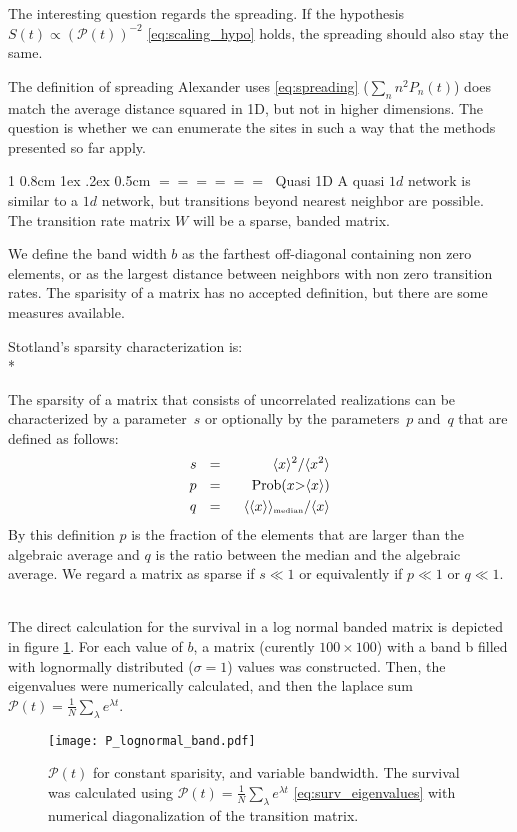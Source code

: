 \documentclass[onecolumn,fleqn,notitlepage,secnumarabic]{revtex4}
\makeatletter
\newcommand{\tbox}[1]{\mbox{\tiny #1}}
\newenvironment{fminipage}%
  {\begin{Sbox}\begin{minipage}}%
  {\end{minipage}\end{Sbox}\fbox{\TheSbox}}
\def\section{%
  \@startsection
    {section}%
    {1}%
    {\z@}%
    {0.8cm \@plus1ex \@minus .2ex}%
    {0.5cm}%
    {\Large\bf $=\!=\!=\!=\!=\!=\;$}%
}%
\makeatother
\begin{document}
The interesting question regards the spreading. If the hypothesis $S(t) \propto \left(\mathcal{P}(t)\right)^{-2}$ \eqref{eq:scaling_hypo} holds, the spreading should also stay the same. 

The definition of spreading Alexander uses \eqref{eq:spreading} ($\sum_n n^2 P_n(t)$) does match the average distance squared in 1D, but not in higher dimensions. The question is whether we can enumerate the sites in such a way that the methods presented so far apply.

\section{Quasi 1D}\label{sec:quasi1d}
A quasi $1d$ network is similar to a $1d$ network, but transitions beyond nearest neighbor are possible. The transition rate matrix $W$ will be a sparse, banded matrix. 

We define the band width $b$ as the farthest off-diagonal containing non zero elements, or as the largest distance between neighbors with non zero transition rates. The sparisity of a matrix has no accepted definition, but there are some measures available.


Stotland's \cite{Stotland:2010:PRB}  sparsity characterization is:\\*
\begin{fminipage}{\textwidth}
The sparsity of a matrix that consists of 
uncorrelated realizations can be characterized 
by a parameter~$s$ or optionally 
by the parameters~$p$ and~$q$ that 
are defined as follows: 
%
\begin{align*}
s \ \ &=& \ \ \langle x \rangle^2 / \langle x^2 \rangle \\
p \ \ &=& \ \ \mbox{Prob}(x {>} \langle x\rangle) \\
q \ \ &=& \ \ \langle\langle x \rangle\rangle_{\tbox{median}}/\langle x \rangle
\end{align*}
%
By this definition $p$ is the fraction of the elements that 
are larger than the algebraic average and $q$ is the ratio between the median
and the algebraic average.
We regard a matrix as sparse if $s\ll1$  
or equivalently if $p \ll 1$ or $q \ll 1$. 

\end{fminipage}
\\

The direct calculation for the survival in a log normal banded matrix is depicted in figure \ref{fig:p_lognormal_band}. For each value of $b$, a matrix (curently $100
\times 100$) with a band b filled with lognormally distributed ($\sigma=1$) values was constructed. Then, the eigenvalues were numerically calculated, and then the laplace sum $\mathcal{P}(t) =\frac{1}{N}\sum_\lambda e^{\lambda t}$.
\begin{figure}
\texttt{[image: P\_lognormal\_band.pdf]}
\caption{$\mathcal{P}(t)$ for constant sparisity, and variable bandwidth. The survival was calculated using $\mathcal{P}(t) =\frac{1}{N}\sum_\lambda e^{\lambda t}$ \eqref{eq:surv_eigenvalues} with numerical diagonalization of the transition matrix.
}
\label{fig:p_lognormal_band}
\end{figure}
\end{document}
